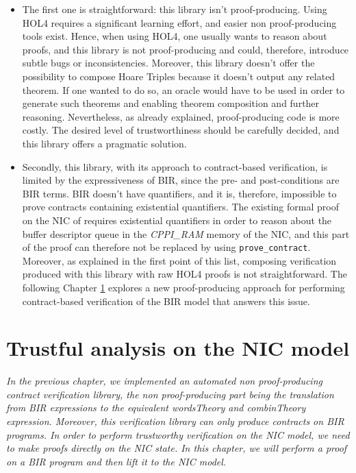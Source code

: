 \documentclass{kththesis}
\begin{document}
{\begin{itemize}
	\item The first one is straightforward: this library isn't \gls{proof-producing}. Using HOL4 requires a significant learning effort, and easier non proof-producing tools exist. Hence, when using HOL4, one usually wants to reason about proofs, and this library is not proof-producing and could, therefore, introduce subtle bugs or inconsistencies. Moreover, this library doesn't offer the possibility to compose Hoare Triples because it doesn't output any related theorem. If one wanted to do so, an oracle would have to be used in order to generate such theorems and enabling theorem composition and further reasoning. Nevertheless, as already explained, proof-producing code is more costly. The desired level of trustworthiness should be carefully decided, and this library offers a pragmatic solution.
	\item Secondly, this library, with its approach to contract-based verification, is limited by the expressiveness of BIR, since the pre- and post-conditions are BIR terms. BIR doesn't have quantifiers, and it is, therefore, impossible to prove contracts containing existential quantifiers. The existing formal proof on the NIC of \cite{haglund_formal_2016} requires existential quantifiers in order to reason about the buffer descriptor queue in the \textit{CPPI\_RAM} memory of the NIC, and this part of the proof can therefore not be replaced by using \texttt{prove\_contract}. Moreover, as explained in the first point of this list, composing verification produced with this library with raw HOL4 proofs is not straightforward. The following Chapter \ref{trustful-nic-analysis} explores a new proof-producing approach for performing contract-based verification of the BIR model that answers this issue.
\end{itemize}

\chapter{Trustful analysis on the NIC model} \label{trustful-nic-analysis}
\vspace{-1cm}
\textit{In the previous chapter, we implemented an automated non \gls{proof-producing} contract verification library, the non proof-producing part being the translation from BIR expressions to the equivalent \textit{wordsTheory} and \textit{combinTheory} expression. Moreover, this verification library can only produce contracts on BIR programs. In order to perform trustworthy verification on the \gls{NIC} model, we need to make proofs directly on the \gls{NIC} state. In this chapter, we will perform a proof on a BIR program and then lift it to the \gls{NIC} model.}

}
\end{document}
